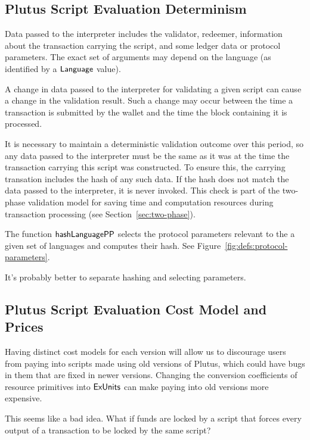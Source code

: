 \subsection{Plutus Script Evaluation Determinism}
\label{sec:determinism}

Data passed to the interpreter
includes the validator, redeemer, information about the transaction carrying
the script, and some ledger data or protocol parameters.
The exact set of arguments may depend on the language (as identified by a $\mathsf{Language}$ value).

A change in data passed to the interpreter for
validating a given script can cause a change in the validation result. Such
a change may occur between the time a transaction is submitted by the wallet
and the time the block containing it is processed. 

It is necessary to maintain a deterministic validation outcome over this period,
so any data passed to the interpreter must be
the same as it was at the time the transaction carrying this script was
constructed.
To ensure this, the carrying transation includes the hash of any such data.
If the hash does not match the data passed to the interpreter, it is never invoked.
This check is part of the two-phase validation model for saving time and computation
resources during transaction processing (see Section~\ref{sec:two-phase}).

The function $\mathsf{hashLanguagePP}$ selects the protocol parameters relevant to
the a given set of languages and computes their hash.
See Figure~\ref{fig:defs:protocol-parameters}.
\begin{note}
  It's probably better to separate hashing and selecting parameters.
\end{note}

\subsection{Plutus Script Evaluation Cost Model and Prices}
\label{sec:cost-mod}

Having distinct cost models for each version will allow us to discourage users from
paying into scripts made using old versions of Plutus, which could have bugs
in them that are fixed in newer versions. Changing the conversion coefficients
of resource primitives into $\mathsf{ExUnits}$ can make paying into old versions
more expensive.
\begin{note}
  This seems like a bad idea. What if funds are locked by a script that forces every output of a transaction to be locked by the same script?
\end{note}

